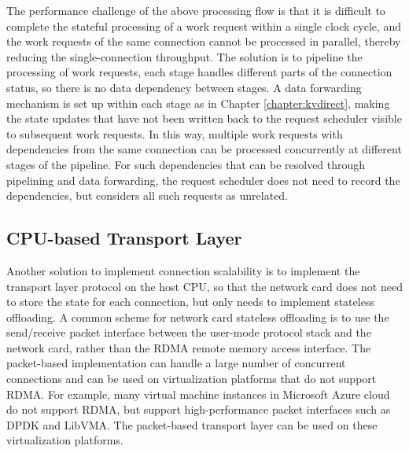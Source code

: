 The performance challenge of the above processing flow is that it is difficult to complete the stateful processing of a work request within a single clock cycle, and the work requests of the same connection cannot be processed in parallel, thereby reducing the single-connection throughput. The solution is to pipeline the processing of work requests, each stage handles different parts of the connection status, so there is no data dependency between stages. A data forwarding mechanism is set up within each stage as in Chapter \ref{chapter:kvdirect}, making the state updates that have not been written back to the request scheduler visible to subsequent work requests. In this way, multiple work requests with dependencies from the same connection can be processed concurrently at different stages of the pipeline. For such dependencies that can be resolved through pipelining and data forwarding, the request scheduler does not need to record the dependencies, but considers all such requests as unrelated.

\subsection{CPU-based Transport Layer}
\label{socksdirect:subsec:cpu-transport}

Another solution to implement connection scalability is to implement the transport layer protocol on the host CPU, so that the network card does not need to store the state for each connection, but only needs to implement stateless offloading. A common scheme for network card stateless offloading is to use the send/receive packet interface between the user-mode protocol stack and the network card, rather than the RDMA remote memory access interface. The packet-based implementation can handle a large number of concurrent connections and can be used on virtualization platforms that do not support RDMA. For example, many virtual machine instances in Microsoft Azure cloud do not support RDMA, but support high-performance packet interfaces such as DPDK and LibVMA. The packet-based transport layer can be used on these virtualization platforms.

